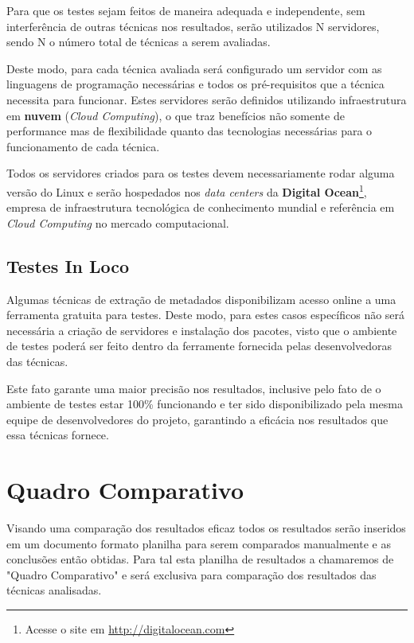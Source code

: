 \documentclass[
	12pt,               %
	openright,          %
	twoside,            %
	a4paper,            %
	english,            %
	brazil              %
	]{abntex2}
\begin{document}
Para que os testes sejam feitos de maneira adequada e independente, sem interferência de outras técnicas nos resultados, serão utilizados N servidores, sendo N o número total de técnicas a serem avaliadas.

Deste modo, para cada técnica avaliada será configurado um servidor com as linguagens de programação necessárias e todos os pré-requisitos que a técnica necessita para funcionar. Estes servidores serão definidos utilizando infraestrutura em \textbf{nuvem} (\textit{Cloud Computing}), o que traz benefícios não somente de performance mas de flexibilidade quanto das tecnologias necessárias para o funcionamento de cada técnica.

 
Todos os servidores criados para os testes devem necessariamente rodar alguma versão do Linux e serão hospedados nos \textit{data centers} da \textbf{Digital Ocean}\footnote{Acesse o site em \url{http://digitalocean.com}}, empresa de infraestrutura tecnológica de conhecimento mundial e referência em \textit{Cloud Computing} no mercado computacional.

\subsection{Testes In Loco}


Algumas técnicas de extração de metadados disponibilizam acesso online a uma ferramenta gratuita para testes. Deste modo, para estes casos específicos não será necessária a criação de servidores e instalação dos pacotes, visto que o ambiente de testes poderá ser feito dentro da ferramente fornecida pelas desenvolvedoras das técnicas.


Este fato garante uma maior precisão nos resultados, inclusive pelo fato de o ambiente de testes estar 100\% funcionando e ter sido disponibilizado pela mesma equipe de desenvolvedores do projeto, garantindo a eficácia nos resultados que essa técnicas fornece.

\section{Quadro Comparativo}

Visando uma comparação dos resultados eficaz todos os resultados serão inseridos em um documento formato planilha para serem comparados manualmente e as conclusões então obtidas. Para tal esta planilha de resultados a chamaremos de "Quadro Comparativo" e será exclusiva para comparação dos resultados das técnicas analisadas.
\end{document}
